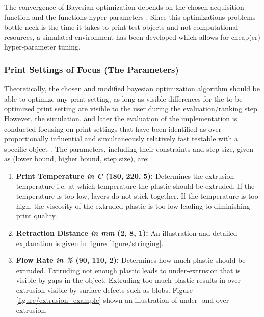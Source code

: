 
The convergence of Bayesian optimization depends on the chosen acquisition function and the functions hyper-parameters \cite{agnihotri2020exploring}. Since this optimizations problems bottle-neck is the time it takes to print test objects and not computational resources, a simulated environment has been developed which allows for cheap(er) hyper-parameter tuning. 

\subsubsection{Print Settings of Focus (The Parameters)}
Theoretically, the chosen and modified bayesian optimization algorithm should be able to optimize any print setting, as long as visible differences for the to-be-optimized print setting are visible to the user during the evaluation/ranking step. However, the simulation, and later the evaluation of the implementation is conducted focusing on print settings that have been identified as over-proportionally influential and simultaneously relatively fast testable with a specific object \cite{paraskevoudis2020real, teachingTechCalibration}. The parameters, including their constraints and step size, given as (lower bound, higher bound, step size), are: 
\begin{enumerate}
    \item \textbf{Print Temperature \textit{in \textdegree C} (180, 220, 5):} Determines the extrusion temperature i.e. at which temperature the plastic should be extruded. If the temperature is too low, layers do not stick together. If the temperature is too high, the viscosity of the extruded plastic is too low leading to diminishing print quality.
    \item \textbf{Retraction Distance \textit{in mm} (2, 8, 1):} An illustration and detailed explanation is given in figure \ref{figure/stringing}.
    \item \textbf{Flow Rate \textit{in \%} (90, 110, 2):} Determines how much plastic should be extruded. Extruding not enough plastic leads to under-extrusion that is visible by gaps in the object. Extruding too much plastic results in over-extrusion visible by surface defects such as blobs. Figure \ref{figure/extrusion_example} shown an illustration of under- and over-extrusion.
\end{enumerate}

